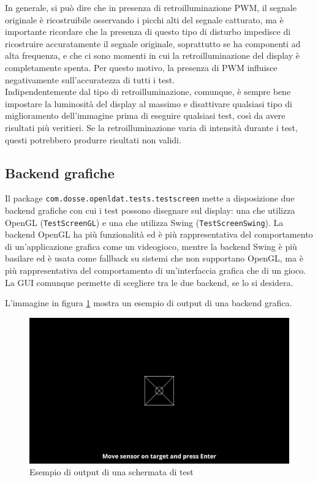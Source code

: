 In generale, si può dire che in presenza di retroilluminazione PWM, il segnale originale è ricostruibile osservando i picchi alti del segnale catturato, ma è importante ricordare che la presenza di questo tipo di disturbo impedisce di ricostruire accuratamente il segnale originale, soprattutto se ha componenti ad alta frequenza, e che ci sono momenti in cui la retroilluminazione del display è completamente spenta. Per questo motivo, la presenza di PWM influisce negativamente sull'accuratezza di tutti i test.\\
Indipendentemente dal tipo di retroilluminazione, comunque, è sempre bene impostare la luminosità del display al massimo e disattivare qualsiasi tipo di miglioramento dell'immagine prima di eseguire qualsiasi test, così da avere risultati più veritieri. Se la retroilluminazione varia di intensità durante i test, questi potrebbero produrre risultati non validi.

\subsection{Backend grafiche}
Il package \texttt{com.dosse.openldat.tests.testscreen} mette a disposizione due backend grafiche con cui i test possono disegnare sul display: una che utilizza OpenGL (\texttt{TestScreenGL}) e una che utilizza Swing (\texttt{TestScreenSwing}). La backend OpenGL ha più funzionalità ed è più rappresentativa del comportamento di un'applicazione grafica come un videogioco, mentre la backend Swing è più basilare ed è usata come fallback su sistemi che non supportano OpenGL, ma è più rappresentativa del comportamento di un'interfaccia grafica che di un gioco. La GUI comunque permette di scegliere tra le due backend, se lo si desidera.

L'immagine in figura \ref{fig:testscreen_example} mostra un esempio di output di una backend grafica.

\begin{figure}[h]
	\centering
	\includegraphics[width=\textwidth]{Applicazione_files/testscreen_example.png}
	\caption{Esempio di output di una schermata di test}
	\label{fig:testscreen_example}
\end{figure}

